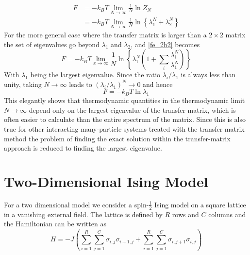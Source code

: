 %
\begin{align}
F&=-k_{B}T\lim_{N\to\infty}\frac{1}{N}\ln Z_{N}\\
&=-k_{B}T\lim_{N\to\infty}\frac{1}{N}\ln  \left\{ \lambda_{1}^{N}+\lambda_{2}^{N}\right\} \label{fe_2b2}
\end{align}
%
For the more general case where the transfer matrix is larger than a $2 \times 2$ matrix the set of eigenvalues go beyond $\lambda_{1}$ and $\lambda_{2}$, and \eqref{fe_2b2} becomes  
%
\begin{equation}
F=-k_{B}T\lim_{x\to\infty}\frac{1}{N}\ln \left\{ \lambda_{1}^{N}\left(1+\sum_{i}\frac{\lambda_{i}^{N}}{\lambda_{1}^{N}} \right)\right\} \label{fe_general}
\end{equation}
%
With $\lambda_{1}$ being the largest eigenvalue. Since the ratio $\lambda_{i}/\lambda_{1}$ is always less than unity, taking $N\to\infty$ leads to $\left(\lambda_{i}/\lambda_{1}\right)^{N}\to 0$ and hence
%
\begin{equation}
F=-k_{B} T \ln\lambda_{1}
\end{equation}
%
This elegantly shows that thermodynamic quantities in the thermodynamic limit $N\to\infty$ depend only on the largest eigenvalue of the transfer matrix, which is often easier to calculate than the entire spectrum of the matrix. Since this is also true for other interacting many-particle systems treated with the transfer matrix method the problem of finding the exact solution within the transfer-matrix approach is reduced to finding the largest eigenvalue. 

\section{Two-Dimensional Ising Model}

For a two dimensional model we consider a spin-$\frac{1}{2}$ Ising model on a square lattice in a vanishing external field. The lattice is defined by $R$ rows and $C$ columns and the Hamiltonian can be written as \cite{Schultz1964}
%
\begin{equation}
H=-J\left(\sum_{i=1}^{R}\sum_{j=1}^{C}\sigma_{i,j}\sigma_{i+1,j}+\sum_{i=1}^{R}\sum_{j=1}^{C}\sigma_{i,j+1}\sigma_{i,j}\right) 
\end{equation}

